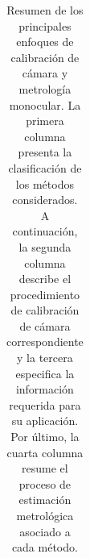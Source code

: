 \begin{table}[H]
\begin{tabular}{p{2.8cm} p{2.8cm} p{2.8cm} p{2.8cm}}
\hline
\end{tabular}
\caption[Resumen de los principales enfoques de calibración de cámara y metrología monocular.]{
  Resumen de los principales enfoques de calibración de cámara y metrología monocular.
  La primera columna presenta la clasificación de los métodos considerados.
  A continuación, la segunda columna describe el procedimiento de calibración de cámara
  correspondiente y la tercera especifica la información requerida para su aplicación.
  Por último, la cuarta columna resume el proceso de estimación metrológica asociado a cada método.
}
\label{tab:calib_metrology}
\end{table}
